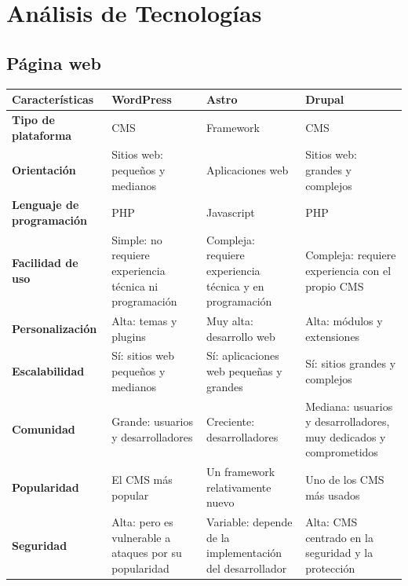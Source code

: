     \section{Análisis de Tecnologías}
        
        \subsection{Página web}

            \begin{table}[!htbp]
                \centering
                
                \small
                
                \begin{tabular}{|>{\centering\arraybackslash}m{3cm}|>{\centering\arraybackslash}m{3.5cm}|>{\centering\arraybackslash}m{3.5cm}|>{\centering\arraybackslash}m{3.5cm}|}
                    \hline
                    \textbf{Características} & \textbf{WordPress} & \textbf{Astro} & \textbf{Drupal} \\
                    \hline
                    \hline
                    \textbf{Tipo de plataforma} & CMS & Framework & CMS \\
                    \hline
                    \textbf{Orientación} & Sitios web: pequeños y medianos & Aplicaciones web & Sitios web: grandes y complejos\\
                    \hline
                    \textbf{Lenguaje de programación} & PHP & Javascript & PHP \\
                    \hline
                    \textbf{Facilidad de uso} & Simple: no requiere experiencia técnica ni programación & Compleja: requiere experiencia técnica y en programación & Compleja: requiere experiencia con el propio CMS \\
                    \hline
                    \textbf{Personalización} & Alta: temas y plugins & Muy alta: desarrollo web & Alta: módulos y extensiones \\
                    \hline
                    \textbf{Escalabilidad} & Sí: sitios web pequeños y medianos & Sí: aplicaciones web pequeñas y grandes & Sí: sitios grandes y complejos \\
                    \hline
                    \textbf{Comunidad} & Grande: usuarios y desarrolladores & Creciente: desarrolladores & Mediana: usuarios y desarrolladores, muy dedicados y comprometidos \\
                    \hline
                    \textbf{Popularidad} & El CMS más popular & Un framework relativamente nuevo & Uno de los CMS más usados \\
                    \hline
                    \textbf{Seguridad} & Alta: pero es vulnerable a ataques por su popularidad & Variable: depende de la implementación del desarrollador & Alta: CMS centrado en la seguridad y la protección \\
                    \hline
                \end{tabular}
                

\end{table}
